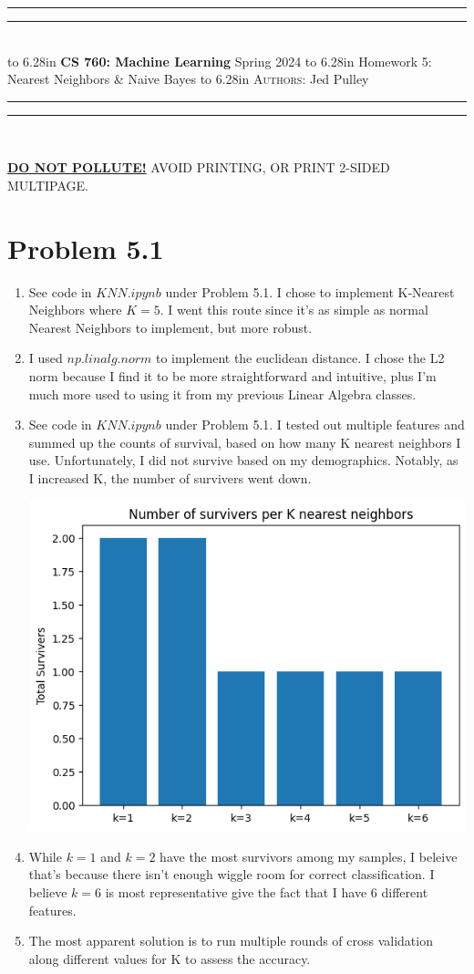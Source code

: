 \documentclass{article}
\newcommand{\lecture}[2]{
\pagestyle{myheadings}
\thispagestyle{plain}
\newpage
\noindent
\begin{center}
\rule{\textwidth}{1.6pt}\vspace*{-\baselineskip}\vspace*{2pt} %
\rule{\textwidth}{0.4pt}\\[1\baselineskip] %
\vbox{\vspace{2mm}
\hbox to 6.28in { {\bf CS 760: Machine Learning} \hfill Spring 2024 }
\vspace{4mm}
\hbox to 6.28in { {\Large \hfill #1  \hfill} }
\vspace{4mm}
\hbox to 6.28in { {\scshape Authors:}  #2 \hfill }}
\vspace{-2mm}
\rule{\textwidth}{0.4pt}\vspace*{-\baselineskip}\vspace{3.2pt} %
\rule{\textwidth}{1.6pt}\\[\baselineskip] %
\end{center}
\vspace*{4mm}
}
\begin{document}
\lecture{Homework 5: Nearest Neighbors \& Naive Bayes}{Jed Pulley}

\begin{center}
{\Large {\sf \underline{\textbf{DO NOT POLLUTE!}} AVOID PRINTING, OR PRINT 2-SIDED MULTIPAGE.}}
\end{center}

\section*{Problem 5.1}
  \begin{enumerate}[label=(\alph*)]
    \item See code in $KNN.ipynb$ under Problem 5.1. I chose to implement K-Nearest Neighbors where $K=5$. I went this route since it's as simple as normal Nearest Neighbors to implement, but more robust.
    \item I used $np.linalg.norm$ to implement the euclidean distance. I chose the L2 norm because I find it to be more straightforward and intuitive, plus I'm much more used to using it from my previous Linear Algebra classes.
    \item See code in $KNN.ipynb$ under Problem 5.1. I tested out multiple features and summed up the counts of survival, based on how many K nearest neighbors I use. Unfortunately, I did not survive based on my demographics. Notably, as I increased K, the number of survivers went down. \\
    \parbox{\linewidth}{\centering \includegraphics[scale=0.6]{bar_plot.png}}
    \item While $k=1$ and $k=2$ have the most survivors among my samples, I beleive that's because there isn't enough wiggle room for correct classification. I believe $k=6$ is most representative give the fact that I have 6 different features.
    \item The most apparent solution is to run multiple rounds of cross validation along different values for K to assess the accuracy.
  \end{enumerate}
\end{document}
